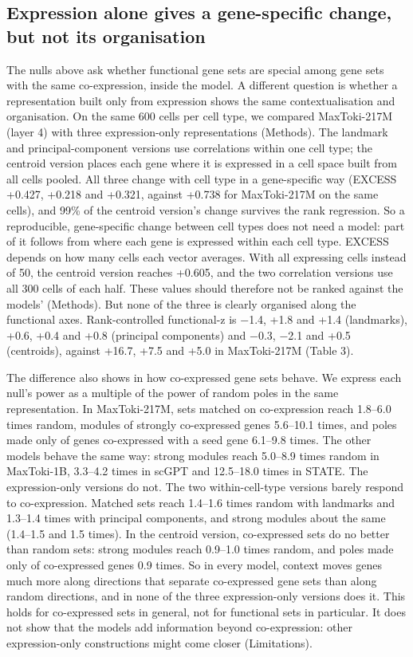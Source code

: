 \documentclass[
  11pt,
]{article}
\newcounter{none} %
\begin{document}
\subsection{Expression alone gives a gene-specific change, but not its
organisation}\label{expression-alone-gives-a-gene-specific-change-but-not-its-organisation}

The nulls above ask whether functional gene sets are special among gene
sets with the same co-expression, inside the model. A different question
is whether a representation built only from expression shows the same
contextualisation and organisation. On the same 600 cells per cell type,
we compared MaxToki-217M (layer 4) with three expression-only
representations (Methods). The landmark and principal-component versions
use correlations within one cell type; the centroid version places each
gene where it is expressed in a cell space built from all cells pooled.
All three change with cell type in a gene-specific way (EXCESS +0.427,
+0.218 and +0.321, against +0.738 for MaxToki-217M on the same cells),
and 99\% of the centroid version's change survives the rank regression.
So a reproducible, gene-specific change between cell types does not need
a model: part of it follows from where each gene is expressed within
each cell type. EXCESS depends on how many cells each vector averages.
With all expressing cells instead of 50, the centroid version reaches
+0.605, and the two correlation versions use all 300 cells of each half.
These values should therefore not be ranked against the models'
(Methods). But none of the three is clearly organised along the
functional axes. Rank-controlled functional-z is −1.4, +1.8 and +1.4
(landmarks), +0.6, +0.4 and +0.8 (principal components) and −0.3, −2.1
and +0.5 (centroids), against +16.7, +7.5 and +5.0 in MaxToki-217M
(Table 3).

The difference also shows in how co-expressed gene sets behave. We
express each null's power as a multiple of the power of random poles in
the same representation. In MaxToki-217M, sets matched on co-expression
reach 1.8--6.0 times random, modules of strongly co-expressed genes
5.6--10.1 times, and poles made only of genes co-expressed with a seed
gene 6.1--9.8 times. The other models behave the same way: strong
modules reach 5.0--8.9 times random in MaxToki-1B, 3.3--4.2 times in
scGPT and 12.5--18.0 times in STATE. The expression-only versions do
not. The two within-cell-type versions barely respond to co-expression.
Matched sets reach 1.4--1.6 times random with landmarks and 1.3--1.4
times with principal components, and strong modules about the same
(1.4--1.5 and 1.5 times). In the centroid version, co-expressed sets do
no better than random sets: strong modules reach 0.9--1.0 times random,
and poles made only of co-expressed genes 0.9 times. So in every model,
context moves genes much more along directions that separate
co-expressed gene sets than along random directions, and in none of the
three expression-only versions does it. This holds for co-expressed sets
in general, not for functional sets in particular. It does not show that
the models add information beyond co-expression: other expression-only
constructions might come closer (Limitations).
\end{document}
